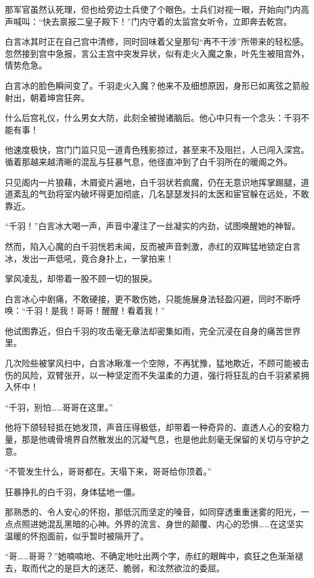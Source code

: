 那军官虽然认死理，但也给旁边士兵使了个眼色。士兵们对视一眼，开始向门内高声喊叫：“快去禀报二皇子殿下！”门内守着的太监宫女听令，立即奔去乾宫。

白言冰其时正在自己宫中清修，同时回味着父皇那句“再不干涉”所带来的轻松感。忽然接到宫中急报，言公主宫中突发异状，似有走火入魔之象，叶先生被阻宫外，情势危急。

白言冰的脸色瞬间变了。千羽走火入魔？他来不及细想原因，身形已如离弦之箭般射出，朝着坤宫狂奔。

什么后宫礼仪，什么男女大防，此刻全被抛诸脑后。他心中只有一个念头：千羽不能有事！

他速度极快，宫门门监只见一道青色残影掠过，甚至来不及阻拦，人已闯入深宫。循着那越来越清晰的混乱与狂暴气息，他径直冲到了白千羽所在的暖阁之外。

只见阁内一片狼藉，木屑瓷片遍地，白千羽状若疯魔，仍在无意识地挥掌踢腿，道道紊乱的气劲将室内破坏得更加彻底，几名瑟瑟发抖的太医和宦官躲在远处，不敢靠近。

“千羽！”白言冰大喝一声，声音中灌注了一丝凝实的内劲，试图唤醒她的神智。

然而，陷入心魔的白千羽恍若未闻，反而被声音刺激，赤红的双眸猛地锁定白言冰，发出一声低吼，竟合身扑上，一掌拍来！

掌风凌乱，却带着一股不顾一切的狠戾。

白言冰心中剧痛，不敢硬接，更不敢伤她，只能施展身法轻盈闪避，同时不断呼唤：“千羽！是我！哥哥！醒醒！看着我！”

他试图靠近，但白千羽的攻击毫无章法却密集如雨，完全沉浸在自身的痛苦世界里。

几次险些被掌风扫中，白言冰瞅准一个空隙，不再犹豫，猛地欺近，不顾可能被击伤的风险，双臂张开，以一种坚定而不失温柔的力道，强行将狂乱的白千羽紧紧拥入怀中！

“千羽，别怕……哥哥在这里。”

他将下颌轻轻抵在她发顶，声音压得极低，却带着一种奇异的、直透人心的安稳力量，那是他魂骨境界自然散发出的沉凝气息，也是他此刻毫无保留的关切与守护之意。

“不管发生什么，哥哥都在。天塌下来，哥哥给你顶着。”

狂暴挣扎的白千羽，身体猛地一僵。

那熟悉的、令人安心的怀抱，那低沉而坚定的嗓音，如同穿透重重迷雾的阳光，一点点照进她混乱黑暗的心神。外界的流言、身世的颠覆、内心的恐惧……在这坚实温暖的怀抱面前，似乎暂时被隔开了。

“哥……哥哥？”她喃喃地、不确定地吐出两个字，赤红的眼眸中，疯狂之色渐渐褪去，取而代之的是巨大的迷茫、脆弱，和泫然欲泣的委屈。

